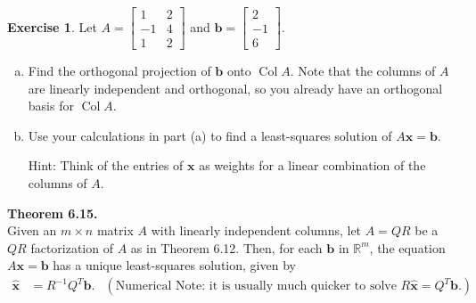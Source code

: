 \documentclass[10pt]{book}
\newcommand{\boxcolor}{gray!30}
\newenvironment{boxthm}{\begin{mdframed}[backgroundcolor=\boxcolor,nobreak=true]}{\end{mdframed}}
\theoremstyle{definition}
\newtheorem{exercise}{Exercise}[section]
\newcommand{\R}{\mathbb{R}}
\newcommand{\vect}[1]{\ensuremath{\boldsymbol{\mathbf{#1}}}}
\DeclareMathOperator{\Col}{Col}
\newcommand{\Axb}{A\vect{x}=\vect{b}}
\newcommand{\xhat}{\hat{\vect{x}}}
\begin{document}
\begin{exercise} %
	Let $ A = \begin{bmatrix}1&2\\-1&4\\1&2\end{bmatrix} $ and $ \vect{b} = \begin{bmatrix}2\\-1\\6\end{bmatrix} $.
	\begin{enumerate}[(a)]
		\item Find the orthogonal projection of $\vect{b}$ onto $\Col A$. Note that the columns of $A$ are linearly independent and orthogonal, so you already have an orthogonal basis for $\Col A$.
		\vspace{1.75in}
		\item Use your calculations in part (a) to find a least-squares solution of $\Axb$. \par Hint: Think of the entries of $\vect{x}$ as weights for a linear combination of the columns of $A$.
		\vspace{4em}
	\end{enumerate}
\end{exercise}


\begin{boxthm}
	\textbf{Theorem 6.15.} \\
	Given an $m\times n$ matrix $A$ with linearly independent columns, let $A=QR$ be a $QR$ factorization of $A$ as in Theorem 6.12. Then, for each $\vect{b}$ in $\R^m$, the equation $\Axb$ has a unique least-squares solution, given by
	\vspace{-1em}
	\begin{align*}
	\xhat &= R^{-1}Q^T\vect{b}. &
	(\text{Numerical Note: it is usually much quicker to solve } R\xhat = Q^T\vect{b}.)
	\end{align*}
\end{boxthm}
\end{document}
